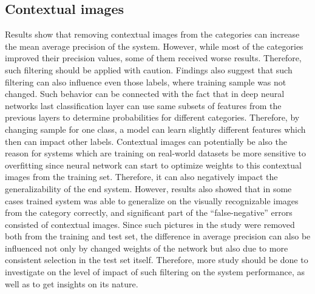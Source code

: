\subsection{Contextual images}
Results show that removing contextual images from the categories can increase the mean average precision of the system. However, while most of the categories improved their precision values, some of them received worse results. Therefore, such filtering should be applied with caution. Findings also suggest that such filtering can also influence even those labels, where training sample was not changed. Such behavior can be connected with the fact that in deep neural networks last classification layer can use same subsets of features from the previous layers to determine probabilities for different categories. Therefore, by changing sample for one class, a model can learn slightly different features which then can impact other labels.  Contextual images can potentially be also the reason for systems which are training on real-world datasets be more sensitive to overfitting since neural network can start to optimize weights to this contextual images from the training set. Therefore, it can also negatively impact the generalizability of the end system. However, results also showed that in some cases trained system was able to generalize on the visually recognizable images from the category correctly, and significant part of the ``false-negative'' errors consisted of contextual images. Since such pictures in the study were removed both from the training and test set, the difference in average precision can also be influenced not only by changed weights of the network but also due to more consistent selection in the test set itself. Therefore, more study should be done to investigate on the level of impact of such filtering on the system performance, as well as to get insights on its nature.

